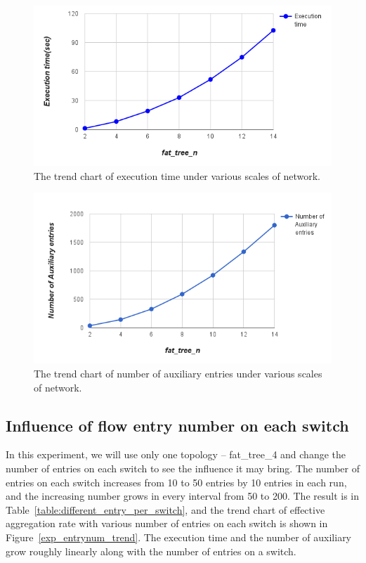 \begin{figure}[H]
\begin{center} 
\includegraphics[width=1\textwidth]{figures/exp_scale_time_trend.png}
\end{center}
\caption{The trend chart of execution time under various scales of network.}
\label{different_scale_time_trend}
\end{figure}

\begin{figure}[H]
\begin{center} 
\includegraphics[width=1\textwidth]{figures/exp_scale_aux_trend.png}
\end{center}
\caption{The trend chart of number of auxiliary entries under various scales of network.}
\label{different_scale_aux_trend}
\end{figure}

\subsection{Influence of flow entry number on each switch}
In this experiment, we will use only one topology -- fat\_tree\_4 and change the number of entries on each switch to see the influence it may bring. The number of entries on each switch increases from 10 to 50 entries by 10 entries in each run, and the increasing number grows in every interval  from 50 to 200. The result is in Table~\ref{table:different_entry_per_switch}, and the trend chart of effective aggregation rate with various number of entries on each switch is shown in Figure~\ref{exp_entrynum_trend}. The execution time and the number of auxiliary grow roughly linearly along with the number of entries on a switch.

